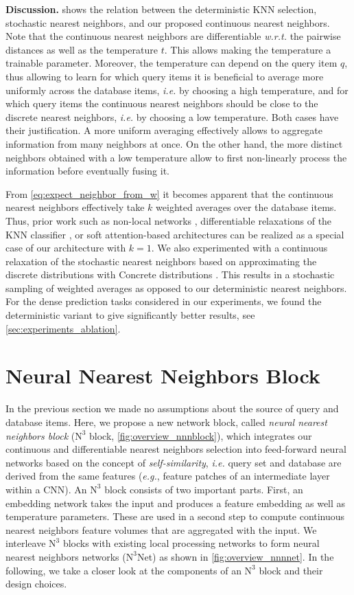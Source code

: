 \documentclass{article}
\makeatletter
\newcommand{\eg}{\emph{e.\thinspace{}g.}\@\xspace}
\newcommand{\ie}{\emph{i.\thinspace{}e.}\@\xspace}
\newcommand{\wrt}{\emph{w.\thinspace{}r.\thinspace{}t.}\@\xspace}
\newcommand{\myparagraph}[1]{\smallskip\noindent\textbf{#1}}
\newcommand\q{q}
\newcommand\kk{k}
\newcommand\tcat{t}
\newcommand\nnn{\text{N}^3}
\makeatother
\begin{document}
\myparagraph{Discussion.}
 shows the relation between the deterministic KNN selection, stochastic nearest neighbors, and our proposed continuous nearest neighbors.
Note that the continuous nearest neighbors are differentiable \wrt 
the pairwise distances as well as the temperature $\tcat$. 
This allows making the temperature a trainable parameter. Moreover, the
temperature can depend on the query item $\q$, thus allowing to learn for
which query items it is beneficial to average more uniformly across the
database items, \ie by choosing a high temperature, and for which query items
the continuous nearest neighbors should be close to the discrete nearest
neighbors, \ie by choosing a low temperature. 
Both cases have their justification. 
A more uniform averaging effectively allows to aggregate information from many neighbors at once.
On the other hand, the more distinct neighbors obtained with a low temperature allow to first non-linearly process the information before eventually fusing it.


From \cref{eq:expect_neighbor_from_w} it becomes apparent that the
continuous nearest neighbors effectively take $\kk$ weighted averages over
the database items.
Thus, prior work such as non-local networks \cite{Wang:2017:NLN}, differentiable relaxations of the KNN classifier \cite{Vinyals:2016:MNF}, or soft attention-based architectures \cite{Graves:2014:NTM} can be realized as a special case of our architecture with $\kk=1$.
We also experimented with a continuous relaxation of the 
stochastic nearest neighbors
based on approximating the discrete distributions with Concrete distributions
\cite{Jang:2016:CRW,Maddison:2016:TCD}.
This results in a stochastic sampling of weighted averages as opposed to our deterministic nearest neighbors.
For the dense prediction tasks considered in our experiments, we found
the deterministic variant to give significantly better results, see \cref{sec:experiments_ablation}.  \section{Neural Nearest Neighbors Block}
\label{sec:nldn}
In the previous section we made no assumptions about the source of query and database items. 
Here, we propose a new network block, called \emph{neural nearest neighbors block} ($\nnn$ block, \cref{fig:overview_nnnblock}), 
which integrates our continuous and differentiable nearest neighbors selection
into feed-forward neural networks based on the concept of \emph{self-similarity},
\ie query set and database are derived from the same features
(\eg, feature patches of an intermediate layer within a CNN).
An $\nnn$ block consists of two important parts.
First, an embedding network takes the input and produces a feature embedding as well as temperature parameters.
These are used in a second step to compute continuous nearest neighbors feature volumes that are aggregated with the input.
We interleave $\nnn$ blocks with existing local processing networks to form neural nearest neighbors networks ($\nnn$Net) as shown in \cref{fig:overview_nnnnet}.
In the following, we take a closer look at the components of an $\nnn$ block and their design choices.
\end{document}
